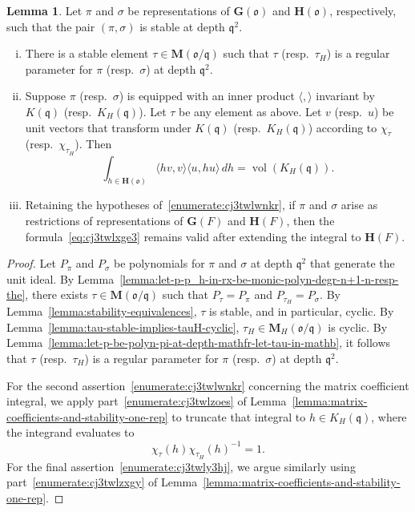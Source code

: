 \documentclass[reqno]{amsart}
\DeclareMathOperator{\vol}{vol}
\theoremstyle{plain} \newtheorem{theorem} {Theorem} \newtheorem{conjecture} {Conjecture} \newtheorem{corollary} [theorem] {Corollary} \newtheorem{proposition} [theorem] {Proposition} \newtheorem{fact} [theorem] {Fact}
\theoremstyle{definition} \newtheorem{definition} [theorem] {Definition}
\theoremstyle{itplain} %
\newtheorem{lemma}[theorem]{Lemma}
\newcommand{\mfq}{\mathfrak{q}}
\begin{document}
\begin{lemma}\label{lemma:let-pi-sigma-be-pair-repr-mathbfgm-mathbfhm-test-vectors-stable-pairs}
  Let $\pi$ and $\sigma$ be representations of $\mathbf{G}(\mathfrak{o})$ and $\mathbf{H}(\mathfrak{o})$, respectively, such that the pair $(\pi,\sigma)$ is stable at depth $\mfq^2$.
  \begin{enumerate}[(i)]
  \item There is a stable element $\tau \in \mathbf{M}(\mathfrak{o}/\mfq)$ such that $\tau$ (resp.\ $\tau_H$) is a regular parameter for $\pi$ (resp.\ $\sigma$) at depth $\mfq^2$.
  \item\label{enumerate:cj3twlwnkr} Suppose $\pi$ (resp.\ $\sigma$) is equipped with an inner product $\langle , \rangle$ invariant by $K(\mfq)$ (resp.\ $K_H(\mfq)$). Let $\tau$ be any element as above.  Let $v$ (resp.\ $u$) be unit vectors that transform under $K(\mfq)$ (resp.\ $K_H(\mfq)$) according to $\chi_\tau$ (resp.\ $\chi_{\tau_H}$).  Then
    \begin{equation}\label{eq:cj3twlxge3}
      \int_{h \in \mathbf{H}(\mathfrak{o})} \langle h v, v \rangle \langle u, h u \rangle \, d h
      = \vol(K_H(\mfq)).  
    \end{equation}
  \item\label{enumerate:cj3twly3hj} Retaining the hypotheses of~\eqref{enumerate:cj3twlwnkr}, if $\pi$ and $\sigma$ arise as restrictions of representations of $\mathbf{G}(F)$ and $\mathbf{H}(F)$, then the formula~\eqref{eq:cj3twlxge3} remains valid after extending the integral to $\mathbf{H}(F)$.
  \end{enumerate}
\end{lemma}
\begin{proof}
  Let $P_\pi$ and $P_\sigma$ be polynomials for $\pi$ and $\sigma$ at depth $\mfq^2$ that generate the unit ideal.  By Lemma~\ref{lemma:let-p-p_h-in-rx-be-monic-polyn-degr-n+1-n-resp-the}, there exists $\tau \in \mathbf{M}(\mathfrak{o}/\mfq)$ such that $P_{\tau} = P_{\pi}$ and $P_{\tau_H} = P_{\sigma}$.  By Lemma~\ref{lemma:stability-equivalences}, $\tau$ is stable, and in particular, cyclic.  By Lemma~\ref{lemma:tau-stable-implies-tauH-cyclic}, $\tau_H \in \mathbf{M}_H(\mathfrak{o}/\mfq)$ is cyclic.  By Lemma~\ref{lemma:let-p-be-polyn-pi-at-depth-mathfr-let-tau-in-mathb}, it follows that $\tau$ (resp.\ $\tau_H$) is a regular parameter for $\pi$ (resp.\ $\sigma$) at depth $\mfq^2$.

  For the second assertion~\eqref{enumerate:cj3twlwnkr} concerning the matrix coefficient integral, we apply part~\eqref{enumerate:cj3twlzoes} of Lemma~\ref{lemma:matrix-coefficients-and-stability-one-rep} to truncate that integral to $h \in K_H(\mfq)$, where the integrand evaluates to
  \begin{equation*}
    \chi_\tau(h) {\chi_{\tau_H}(h)}^{-1} = 1.
  \end{equation*}
  For the final assertion~\eqref{enumerate:cj3twly3hj}, we argue similarly using part~\eqref{enumerate:cj3twlzxgy} of Lemma~\ref{lemma:matrix-coefficients-and-stability-one-rep}.
\end{proof}
\end{document}
